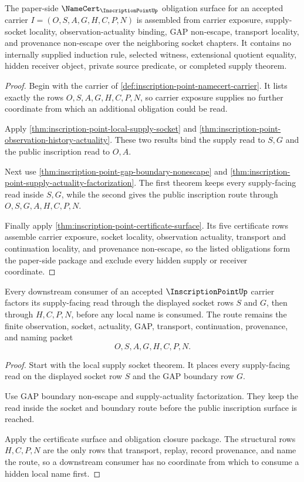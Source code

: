\begin{theorem}
\label{thm:inscription-point-obligation-closure-package}
The paper-side $\NameCert_{\InscriptionPointUp}$ obligation surface for an accepted carrier $I=(O,S,A,G,H,C,P,N)$ is assembled from carrier exposure, supply-socket locality, observation-actuality binding, GAP non-escape, transport locality, and provenance non-escape over the neighboring socket chapters. It contains no internally supplied induction rule, selected witness, extensional quotient equality, hidden receiver object, private source predicate, or completed supply theorem.
\end{theorem}
\begin{proof}
Begin with the carrier of \autoref{def:inscription-point-namecert-carrier}. It lists exactly the rows $O,S,A,G,H,C,P,N$, so carrier exposure supplies no further coordinate from which an additional obligation could be read.

Apply \autoref{thm:inscription-point-local-supply-socket} and \autoref{thm:inscription-point-observation-history-actuality}. These two results bind the supply read to $S,G$ and the public inscription read to $O,A$.

Next use \autoref{thm:inscription-point-gap-boundary-nonescape} and \autoref{thm:inscription-point-supply-actuality-factorization}. The first theorem keeps every supply-facing read inside $S,G$, while the second gives the public inscription route through $O,S,G,A,H,C,P,N$.

Finally apply \autoref{thm:inscription-point-certificate-surface}. Its five certificate rows assemble carrier exposure, socket locality, observation actuality, transport and continuation locality, and provenance non-escape, so the listed obligations form the paper-side package and exclude every hidden supply or receiver coordinate.
\end{proof}

\begin{theorem}
\label{thm:inscription-point-downstream-socket-factorization}
Every downstream consumer of an accepted $\InscriptionPointUp$ carrier factors its supply-facing read through the displayed socket rows $S$ and $G$, then through $H,C,P,N$, before any local name is consumed. The route remains the finite observation, socket, actuality, GAP, transport, continuation, provenance, and naming packet
$$
O,S,A,G,H,C,P,N.
$$
\end{theorem}
\begin{proof}
Start with the local supply socket theorem. It places every supply-facing read on the displayed socket row $S$ and the GAP boundary row $G$.

Use GAP boundary non-escape and supply-actuality factorization. They keep the read inside the socket and boundary route before the public inscription surface is reached.

Apply the certificate surface and obligation closure package. The structural rows $H,C,P,N$ are the only rows that transport, replay, record provenance, and name the route, so a downstream consumer has no coordinate from which to consume a hidden local name first.
\end{proof}

